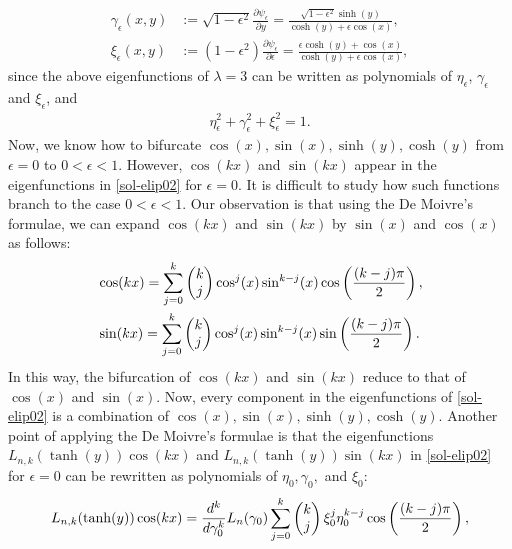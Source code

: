 \documentclass[1 [leqno, 11pt]{amsart}
\numberwithin{equation}{section}
\let\ep=\epsilon
\begin{document}
\begin{CJK*}{GBK}{song}
\begin{align}
\gamma_\ep(x, y)  & :=  \sqrt{1 - \epsilon^2}\frac{ \partial \psi_\ep}{\partial y}= \frac{\sqrt{1 - \epsilon^2}\sinh(y)}{\cosh(y)+\epsilon \cos(x)},\\\label{three-kers3}
\xi_\ep(x, y)  & := (1 - \epsilon^2) \frac{ \partial \psi_\ep}{\partial \ep} = \frac{\epsilon \cosh(y) + \cos(x)}{\cosh(y)+\epsilon \cos(x)},
\end{align}
since  the above eigenfunctions of $\lambda=3$ can be written as polynomials of $\eta_\ep$, $\gamma_\ep$ and $\xi_\ep$, and
\begin{align}\label{eta-gamma-xi}\eta_\ep^2 + \gamma_\ep^2 + \xi_\ep^2 = 1.\end{align}
Now, we know how to bifurcate  $\cos(x),\sin(x),\sinh(y),\cosh(y)$ from $\ep=0$ to $0<\ep<1$.
However,   $\cos(kx)$ and $\sin(kx)$  appear in the eigenfunctions in \eqref{sol-elip02} for $\ep=0$. It is difficult to study how such functions branch to the case $0<\ep<1$. Our  observation is that using the De Moivre's formulae, we  can expand $\cos(kx)$ and $\sin(kx)$ by $\sin(x)$ and $\cos(x) $ as follows:
 \begin{align}\label{De Moivres formula1}
 &\cos(kx)=\sum_{j=0}^k\begin{pmatrix}k\\j\end{pmatrix}\cos^j(x)\sin^{k-j}(x)\cos\left({(k-j)\pi\over2}\right),\\\label{De Moivres formula2}
 &\sin(kx)=\sum_{j=0}^k\begin{pmatrix}k\\j\end{pmatrix}\cos^j(x)\sin^{k-j}(x)\sin\left({(k-j)\pi\over2}\right).
 \end{align}
 In this way, the bifurcation of $\cos(kx)$ and $\sin(kx)$ reduce to that of $\cos(x)$ and $\sin(x)$. Now, every component in the eigenfunctions of \eqref{sol-elip02}
 is a combination of $\cos(x),\sin(x),\sinh(y),\cosh(y)$.
Another point of applying  the De Moivre's formulae is that the eigenfunctions  $L_{n,k}(\tanh(y))\cos(kx)$  and $L_{n,k}(\tanh(y))\sin(kx)$   in \eqref{sol-elip02} for $\ep=0$  can be rewritten as polynomials  of $
\eta_0,
\gamma_0,$ and $
\xi_0$:
\begin{align}\label{ep=0-cos}
 &L_{n,k}(\tanh(y))\cos(kx)
 ={d^k\over d\gamma_0^k}L_n(\gamma_0)
 \sum_{j=0}^k\begin{pmatrix}k\\j\end{pmatrix}\xi_0^j\eta_0^{k-j}\cos\left({(k-j)\pi\over2}\right),\\\label{ep=0-sin}

\end{align}
\end{CJK*}
\end{document}
